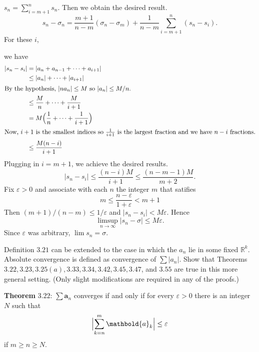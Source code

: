 \begin{exercise}
\begin{exercise}[label = (\alph*), ref = \arabic{exercisei} (\alph*)]
{      \(s_n = \sum_{i = m + 1}^ns_n\).
      Then we obtain the desired result.
    }
    \[
    s_n - \sigma_n = \frac{m + 1}{n - m}(\sigma_n - \sigma_m) +
    \frac{1}{n - m}\sum_{i = m + 1}^n(s_n - s_i).
    \]
    For these \(i\),
    \par\smallskip
    {\color{NavyBlue}
      we have
      \begin{align*}
        \lvert s_n - s_i\rvert
        & = \lvert a_n + a_{n - 1} + \cdots + a_{i + 1}\rvert\\
        & \leq \lvert a_n\rvert + \cdots + \lvert a_{i + 1}\rvert\\
        \intertext{By the hypothesis, \(\lvert na_n\rvert\leq M\) so
        \(\lvert a_n\rvert\leq M/n\).}
        & \leq \frac{M}{n} + \cdots + \frac{M}{i + 1}\\
        & = M\Bigl(\frac{1}{n} + \cdots + \frac{1}{i + 1}\Bigr)\\
        \intertext{Now, \(i + 1\) is the smallest indices so
        \(\frac{1}{i + 1}\) is the largest fraction and we have \(n - i\)
        fractions.}
        & \leq \frac{M(n - i)}{i + 1}
      \end{align*}
      Plugging in \(i = m + 1\), we achieve the desired results.
    }
    \[
    \lvert s_n - s_i\rvert\leq\frac{(n - i)M}{i + 1}\leq
    \frac{(n - m - 1)M}{m + 2}.
    \]
    Fix \(\varepsilon > 0\) and associate with each \(n\) the integer \(m\) that
    satifies
    \[
    m\leq\frac{n - \varepsilon}{1 + \varepsilon} < m + 1
    \]
    Then \((m + 1)/(n - m)\leq 1/\varepsilon\) and
    \(\lvert s_n - s_i\rvert < M\varepsilon\).
    Hence
    \[
    \limsup_{n\to\infty}\lvert s_n - \sigma\rvert\leq M\varepsilon.
    \]
    Since \(\varepsilon\) was arbitrary, \(\lim s_n = \sigma\).
  \end{exercise}
\item
  Definition \(3.21\) can be extended to the case in which the \(a_n\) lie in
  some fixed \(\mathbb{R}^k\).
  Absolute convergence is defined as convergence of \(\sum\lvert a_n\rvert\).
  Show that Theorems \(3.22,3.23,3.25(a),3.33,3.34,3.42,3.45,3.47\), and
  \(3.55\) are true in this more general setting.
  (Only slight modifications are required in any of the proofs.)
  \par\smallskip
  \textbf{Theorem} \(\mathbold{3.22}\): \(\sum\mathbold{a}_n\) converges if
  and only if for every \(\varepsilon > 0\) there is an integer \(N\) such that
  \[
  \Bigl\lvert\sum_{k = n}^m\mathbold{a}_k\Bigr\rvert\leq\varepsilon
  \]
  if \(m\geq n\geq N\).
  \par\smallskip

\end{exercise}
